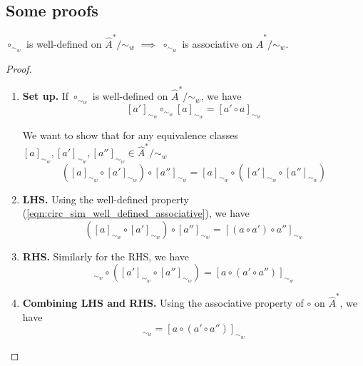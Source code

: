 \subsection{Some proofs}

\begin{proposition}\label{prp:circ_local_well_defined_implies_circ_local_associative}
    $\circ_{\sim_{w}}$ is well-defined on $\hat{A}^{*}/\sim_{w}$ $\implies$ $\circ_{\sim_{w}}$ is associative on $\hat{A}^{*}/\sim_{w}$.
\end{proposition}
\begin{proof}
\begin{enumerate}[(1)]
    \item \textbf{Set up.}
    If $\circ_{\sim_{w}}$ is well-defined on $\hat{A}^{*}/\sim_{w}$, we have
    \begin{equation}\label{eqn:circ_sim_well_defined_associative}
        [a']_{\sim_{w}} \circ_{\sim_{w}} [a]_{\sim_{w}} = [a' \circ a]_{\sim_{w}}
    \end{equation}

    We want to show that for any equivalence classes $[a]_{\sim_{w}}, [a']_{\sim_{w}}, [a'']_{\sim_{w}} \in \hat{A}^{*}/\sim_{w}$
    \begin{equation}
        ([a]_{\sim_{w}} \circ [a']_{\sim_{w}}) \circ [a'']_{\sim_{w}} = [a]_{\sim_{w}} \circ ([a']_{\sim_{w}} \circ [a'']_{\sim_{w}})
    \end{equation}

    \item \textbf{LHS.}
    Using the well-defined property (\cref{eqn:circ_sim_well_defined_associative}), we have
    \begin{equation}
        ([a]_{\sim_{w}} \circ [a']_{\sim_{w}}) \circ [a'']_{\sim_{w}} = [(a \circ a') \circ a'']_{\sim_{w}}
    \end{equation}

    \item \textbf{RHS.}
    Similarly for the RHS, we have
    \begin{equation}
        [a]_{\sim_{w}} \circ ([a']_{\sim_{w}} \circ [a'']_{\sim_{w}}) = [a \circ (a' \circ a'')]_{\sim_{w}}
    \end{equation}
    \item \textbf{Combining LHS and RHS.}
    Using the associative property of $\circ$ on $\hat{A}^{*}$, we have
    \begin{equation}
        [(a \circ a') \circ a'']_{\sim_{w}} = [a \circ (a' \circ a'')]_{\sim_{w}}
    \end{equation}
\end{enumerate}
\end{proof}


